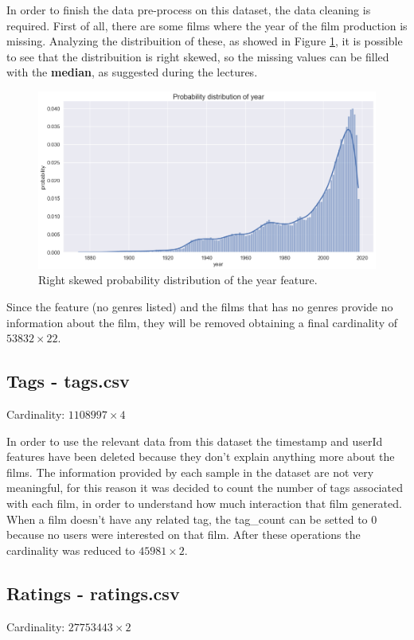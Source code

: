 \documentclass[../main]{subfiles}
\begin{document}
In order to finish the data pre-process on this dataset, the data cleaning is required.
First of all, there are some films where the year of the film production is missing.
Analyzing the distribuition of these, as showed in Figure \ref{fig:year_distribution_missing}, it is possible to see that the distribuition is right skewed, so the missing values can be filled with the \textbf{median}, as suggested during the lectures.
\begin{figure}[h]
    \includegraphics[width=\linewidth]{figures/year_distribution_missing.png}
    \caption{Right skewed probability distribution of the year feature.}
    \label{fig:year_distribution_missing}
\end{figure}

Since the feature (no genres listed) and the films that has no genres provide no information about the film, they will be removed obtaining a final cardinality of $53832 \times 22$.

\subsection*{Tags - tags.csv}
Cardinality: $1108997 \times 4$

In order to use the relevant data from this dataset the timestamp and userId features have been deleted because they don't explain anything more about the films.
The information provided by each sample in the dataset are not very meaningful, for this reason it was decided to count the number of tags associated with each film, in order to understand how much interaction that film generated.
When a film doesn't have any related tag, the tag\_count can be setted to 0 because no users were interested on that film.
After these operations the cardinality was reduced to $45981 \times 2$.

\subsection*{Ratings - ratings.csv}
Cardinality: $27753443 \times 2$
\end{document}
